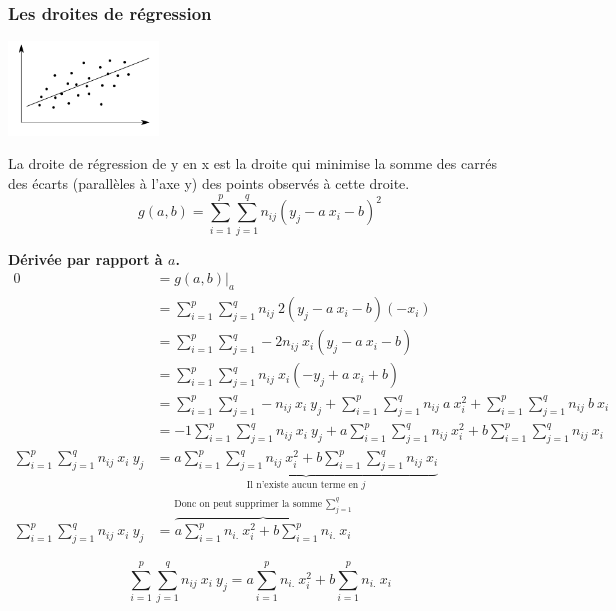 \newpage
\subsubsection{Les droites de régression}

\begin{center}
	\includegraphics[width=0.3\textwidth]{images/droite_de_regression.pdf}
\end{center}
La droite de régression de y en x est la droite qui minimise la somme des carrés des écarts (parallèles à l'axe y) des points observés à cette droite.
$$\boxed{g(a,b) = \sum_{i=1}^{p} \sum_{j=1}^{q} n_{ij} (y_j - a\ x_i - b)^2}$$


\textbf{Dérivée par rapport à $a$.}
\begin{align*}
0 &= \left.g(a,b)\right|_a\\
  &= \sum_{i=1}^{p} \sum_{j=1}^{q} n_{ij}\ 2(y_j - a\ x_i-b)(-x_i)\\
  &= \sum_{i=1}^{p} \sum_{j=1}^{q} -2n_{ij}\ x_i(y_j - a\ x_i - b)\\
  &= \sum_{i=1}^{p} \sum_{j=1}^{q} n_{ij}\ x_i(-y_j + a\ x_i + b)\\
  &= \sum_{i=1}^{p} \sum_{j=1}^{q} -n_{ij}\ x_i\ y_j + \sum_{i=1}^{p} \sum_{j=1}^{q} n_{ij}\ a\ x_i^2 + \sum_{i=1}^{p} \sum_{j=1}^{q} n_{ij}\ b\ x_i\\
  &= -1 \sum_{i=1}^{p} \sum_{j=1}^{q} n_{ij}\ x_i\ y_j + a \sum_{i=1}^{p} \sum_{j=1}^{q} n_{ij}\ x_i^2 + b \sum_{i=1}^{p} \sum_{j=1}^{q} n_{ij}\ x_i\\
  \sum_{i=1}^{p} \sum_{j=1}^{q} n_{ij}\ x_i\ y_j  &= \underbrace{a \sum_{i=1}^{p} \sum_{j=1}^{q} n_{ij}\ x_i^2 + b \sum_{i=1}^{p} \sum_{j=1}^{q} n_{ij}\ x_i}_\text{Il n'existe aucun terme en $j$}\\
\sum_{i=1}^{p} \sum_{j=1}^{q} n_{ij}\ x_i\ y_j  &= \overbrace{a \sum_{i=1}^{p} n_{i.}\ x_i^2 + b \sum_{i=1}^{p} n_{i.}\ x_i}^\text{Donc on peut supprimer la somme $\sum_{j=1}^{q}$}
\end{align*}


$$\boxed{\sum_{i=1}^{p} \sum_{j=1}^{q} n_{ij}\ x_i\ y_j = a \sum_{i=1}^{p} n_{i.}\ x_i^2 + b \sum_{i=1}^{p} n_{i.}\ x_i}$$



